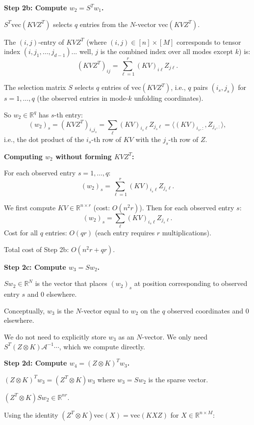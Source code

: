 \documentclass[12pt]{article}
\begin{document}
\textbf{Step 2b: Compute $w_2 = S^T w_1$.}

$S^T \mathrm{vec}(KVZ^T)$ selects $q$ entries from the $N$-vector $\mathrm{vec}(KVZ^T)$.

The $(i,j)$-entry of $KVZ^T$ (where $(i,j) \in [n] \times [M]$ corresponds to tensor index $(i, j_1, \ldots, j_{d-1})$... well, $j$ is the combined index over all modes except $k$) is:
\[
(KVZ^T)_{ij} = \sum_{\ell=1}^r (KV)_{i\ell} Z_{j\ell}.
\]

The selection matrix $S$ selects $q$ entries of $\mathrm{vec}(KVZ^T)$, i.e., $q$ pairs $(i_s, j_s)$ for $s = 1, \ldots, q$ (the observed entries in mode-$k$ unfolding coordinates).

So $w_2 \in \mathbb{R}^q$ has $s$-th entry:
\[
(w_2)_s = (KVZ^T)_{i_s j_s} = \sum_\ell (KV)_{i_s \ell} Z_{j_s \ell} = \langle (KV)_{i_s, :}, Z_{j_s, :}\rangle,
\]
i.e., the dot product of the $i_s$-th row of $KV$ with the $j_s$-th row of $Z$.

\textbf{Computing $w_2$ without forming $KVZ^T$:}

For each observed entry $s = 1, \ldots, q$:
\[
(w_2)_s = \sum_{\ell=1}^r (KV)_{i_s \ell} Z_{j_s \ell}.
\]

We first compute $KV \in \mathbb{R}^{n \times r}$ (cost: $O(n^2 r)$). Then for each observed entry $s$:
\[
(w_2)_s = \sum_\ell (KV)_{i_s \ell} Z_{j_s \ell}.
\]
Cost for all $q$ entries: $O(qr)$ (each entry requires $r$ multiplications).

Total cost of Step 2b: $O(n^2 r + qr)$.

\textbf{Step 2c: Compute $w_3 = S w_2$.}

$S w_2 \in \mathbb{R}^N$ is the vector that places $(w_2)_s$ at position corresponding to observed entry $s$ and $0$ elsewhere.

Conceptually, $w_3$ is the $N$-vector equal to $w_2$ on the $q$ observed coordinates and $0$ elsewhere.

We do not need to explicitly store $w_3$ as an $N$-vector. We only need $S^T (Z\otimes K) \mathcal{A}^{-1}\cdots$, which we compute directly.

\textbf{Step 2d: Compute $w_4 = (Z \otimes K)^T w_3$.}

$(Z\otimes K)^T w_3 = (Z^T \otimes K) w_3$ where $w_3 = S w_2$ is the sparse vector.

$(Z^T \otimes K) S w_2 \in \mathbb{R}^{nr}$.

Using the identity $(Z^T \otimes K)\mathrm{vec}(X) = \mathrm{vec}(KXZ)$ for $X \in \mathbb{R}^{n \times M}$:
\end{document}
